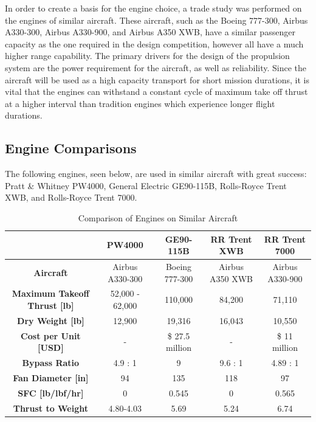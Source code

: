 


In order to create a basis for the engine choice, a trade study was performed on the engines of similar aircraft. These aircraft, such as the Boeing 777-300, Airbus A330-300, Airbus A330-900, and Airbus A350 XWB, have a similar passenger capacity as the one required in the design competition, however all have a much higher range capability. The primary drivers for the design of the propulsion system are the power requirement for the aircraft, as well as reliability. Since the aircraft will be used as a high capacity transport for short mission durations, it is vital that the engines can withstand a constant cycle of maximum take off thrust at a higher interval than tradition engines which experience longer flight durations. 

\subsection{Engine Comparisons}

The following engines, seen below, are used in similar aircraft with great success: Pratt \& Whitney PW4000, General Electric GE90-115B, Rolls-Royce Trent XWB, and Rolls-Royce Trent 7000.

\begin{table}[!h]
    \centering
        \caption{Comparison of Engines on Similar Aircraft}
    \begin{tabular}{|c||c|c|c|c|}\toprule
         & \textbf{PW4000} & \textbf{GE90-115B} & \textbf{RR Trent XWB} & \textbf{RR Trent 7000} \\\hline \hline
         \textbf{Aircraft} & Airbus A330-300 & Boeing 777-300 & Airbus A350 XWB & Airbus A330-900\\ \hline
         \textbf{Maximum Takeoff Thrust [lb]} & 52,000 - 62,000 \cite{PW} & 110,000  \cite{ge90} & 84,200  \cite{xwb} & 71,110  \cite{butterworth}\\ \hline
         \textbf{Dry Weight [lb]} & 12,900  \cite{FAApw} & 19,316  \cite{ge90} & 16,043  \cite{xwb2} & 10,550 \cite{butterworth} \\ \hline
         \textbf{Cost per Unit [USD]} & - & \$ 27.5 million \cite{gecost} & - & \$ 11 million \cite{butterworth} \\ \hline
         \textbf{Bypass Ratio} & 4.9 : 1 \cite{PW} & 9 \cite{safran} & 9.6 : 1 \cite{xwb} & 4.89 : 1 \cite{butterworth} \\ \hline
         \textbf{Fan Diameter [in]} & 94 \cite{PW} & 135 \cite{ge} & 118 \cite{xwb} &  97 \cite{butterworth}\\ \hline
         \textbf{SFC [lb/lbf/hr]} & 0 & 0.545 \cite{butterworth} & 0 &  0.565 \cite{butterworth} \\ \hline
         \textbf{Thrust to Weight} & 4.80-4.03 & 5.69 & 5.24 & 6.74 \\ \bottomrule
    \end{tabular}
    \label{tab:enginecomp}
\end{table}


